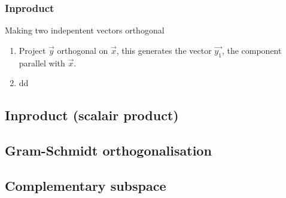 \begin{frame}
	\frametitle{Inproduct}
	\begin{block}{Making two indepentent vectors orthogonal}
		\begin{enumerate}
			\item Project $\overrightarrow{y}$ orthogonal on $\overrightarrow{x}$, this generates the vector $\overrightarrow{y_1}$, the component parallel with $\overrightarrow{x}$.
			\item dd
		\end{enumerate}
	\end{block} 
\end{frame}


	\subsection{Inproduct (scalair product)}
	\subsection{Gram-Schmidt orthogonalisation}
	\subsection{Complementary subspace}
					

